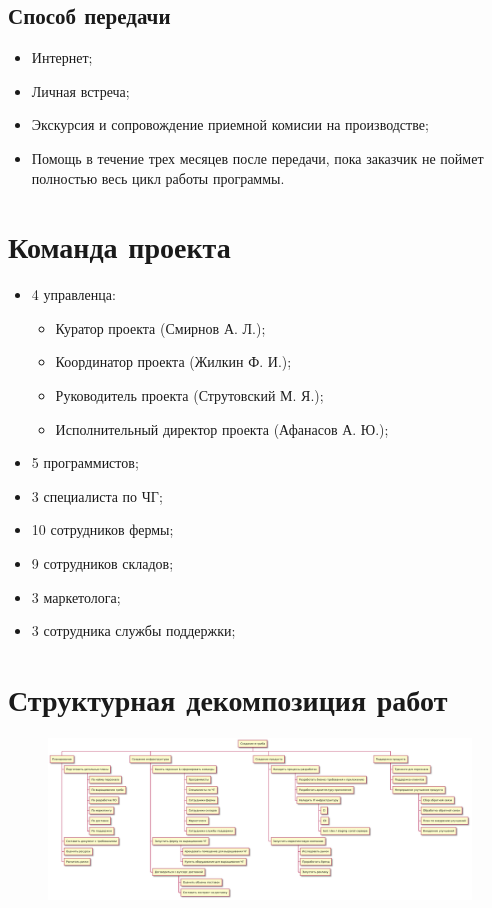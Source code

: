 \documentclass[a4paper,8pt]{article}
\begin{document}
\subsection{Способ передачи}

    \begin{itemize}
        \item Интернет;
        \item Личная встреча;
        \item Экскурсия и сопровождение приемной комисии на производстве;
        \item Помощь в течение трех месяцев после передачи, пока заказчик не поймет полностью весь цикл работы программы.
    \end{itemize}


\section{Команда проекта}

    \begin{itemize}
        \item 4 управленца:
            \begin{itemize}
                \item Куратор проекта (Смирнов А. Л.);
                \item Координатор проекта (Жилкин Ф. И.);
                \item Руководитель проекта (Струтовский М. Я.);
                \item Исполнительный директор проекта (Афанасов А. Ю.);
            \end{itemize}
        \item 5 программистов;
        \item 3 специалиста по ЧГ;
        \item 10 сотрудников фермы;
        \item 9 сотрудников складов;
        \item 3 маркетолога;
        \item 3 сотрудника службы поддержки;
    \end{itemize}


\section{Структурная декомпозиция работ}


    \begin{figure}[h]
        \includegraphics[width=1\textwidth]{./pics/wbs.pdf}
        \centering
    \end{figure}
\end{document}
